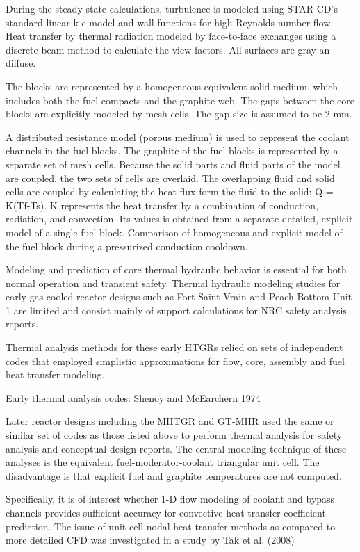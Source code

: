 During the steady-state calculations, turbulence is modeled using STAR-CD's standard linear k-e model and wall functions for high Reynolds number flow.
Heat transfer by thermal radiation modeled by face-to-face exchanges using a discrete beam method to calculate the view factors.
All surfaces are gray an diffuse.

The blocks are represented by a homogeneous equivalent solid medium, which includes both the fuel compacts and the graphite web.
The gaps between the core blocks are explicitly modeled by mesh cells.
The gap size is assumed to be 2 mm.

A distributed resistance model (porous medium) is used to represent the coolant channels in the fuel blocks.
The graphite of the fuel blocks is represented by a separate set of mesh cells.
Because the solid parts and fluid parts of the model are coupled, the two sets of cells are overlaid.
The overlapping fluid and solid cells are coupled by calculating the heat flux form the fluid to the solid: Q = K(Tf-Ts).
K represents the heat transfer by a combination of conduction, radiation, and convection.
Its values is obtained from a separate detailed, explicit model of a single fuel block.
Comparison of homogeneous and explicit model of the fuel block during a pressurized conduction cooldown.

Modeling and prediction of core thermal hydraulic behavior is essential for both normal operation and transient safety.
Thermal hydraulic modeling studies for early gas-cooled reactor designs such as Fort Saint Vrain and Peach Bottom Unit 1 are limited and consist mainly of support calculations for NRC safety analysis reports.

Thermal analysis methods for these early HTGRs relied on sets of independent codes that employed simplistic approximations for flow, core, assembly and fuel heat transfer modeling.

Early thermal analysis codes:
Shenoy and McEarchern 1974 %

Later reactor designs including the MHTGR and GT-MHR used the same or similar set of codes as those listed above to perform thermal analysis for safety analysis and conceptual design reports.
The central modeling technique of these analyses is the equivalent fuel-moderator-coolant triangular unit cell.
The disadvantage is that explicit fuel and graphite temperatures are not computed.

Specifically, it is of interest whether 1-D flow modeling of coolant and bypass channels provides sufficient accuracy for convective heat transfer coefficient prediction.
The issue of unit cell nodal heat transfer methods as compared to more detailed CFD was investigated in a study by Tak et al. (2008) %

